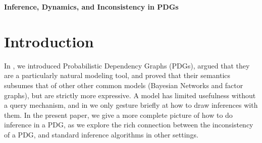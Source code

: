 \documentclass{article}
\theoremstyle{plain}
\theoremstyle{definition}
\theoremstyle{remark}
\newcommand\smid{\!\mid\!}
\newcommand\MAP{\mathrm{MAP}}
\newcommand\ado{\mathrm{do}}
\begin{document}
\begin{center}
	{\bfseries\Large Inference, Dynamics, and Inconsistency in PDGs}
\end{center}

\section{Introduction}

In \cite{}, we introduced Probabilistic Dependency Graphs (PDGs), argued that they are a particularly natural modeling tool, and proved that their semantics subsumes that of other other common models (Bayesian Networks and factor graphs), but are strictly more expressive.
A model has limited usefulness without a query mechanism, and in \cite{} we only gesture briefly at how to draw inferences with them.
In the present paper, we give a more complete picture of how to do inference in a PDG, as we explore the rich connection between the inconsistency of a PDG, and standard inference algorithms in other settings.


%
%



\end{document}
